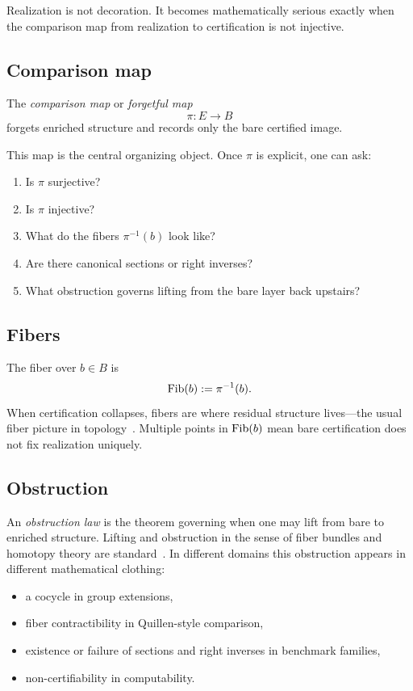 \documentclass[11pt]{article}
\begin{document}
Realization is not decoration. It becomes mathematically serious exactly when the
comparison map from realization to certification is not injective.

\subsection{Comparison map}

The \emph{comparison map} or \emph{forgetful map}
\[
\pi : E \to B
\]
forgets enriched structure and records only the bare certified image.

This map is the central organizing object. Once $\pi$ is explicit, one can ask:
\begin{enumerate}[label=(\alph*)]
  \item Is $\pi$ surjective?
  \item Is $\pi$ injective?
  \item What do the fibers $\pi^{-1}(b)$ look like?
  \item Are there canonical sections or right inverses?
  \item What obstruction governs lifting from the bare layer back upstairs?
\end{enumerate}

\subsection{Fibers}

The fiber over $b \in B$ is
\[
\mathrm{Fib}(b) := \pi^{-1}(b).
\]
When certification collapses, fibers are where residual structure lives---the usual
fiber picture in topology~\cite{Steenrod1951}. Multiple points in $\mathrm{Fib}(b)$ mean bare
certification does not fix realization uniquely.

\subsection{Obstruction}

An \emph{obstruction law} is the theorem governing when one may lift from bare to
enriched structure. Lifting and obstruction in the sense of fiber bundles and
homotopy theory are standard~\cite{Hatcher2002,Steenrod1951}. In different domains
this obstruction appears in different mathematical clothing:
\begin{itemize}
  \item a cocycle in group extensions,
  \item fiber contractibility in Quillen-style comparison,
  \item existence or failure of sections and right inverses in benchmark families,
  \item non-certifiability in computability.
\end{itemize}
\end{document}
